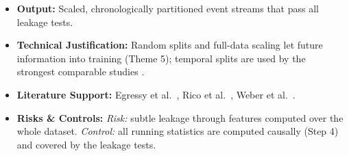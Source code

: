 \documentclass[11pt,a4paper]{article}
\begin{document}
\begin{itemize}[leftmargin=*]
\begin{enumerate}[leftmargin=*]
    \end{enumerate}
    \item \textbf{Output:} Scaled, chronologically partitioned event streams that pass all leakage tests.
    \item \textbf{Technical Justification:} Random splits and full-data scaling let future information into training (Theme 5); temporal splits are used by the strongest comparable studies \cite{egressy2024multigraph,rico2026taml}.
    \item \textbf{Literature Support:} Egressy et al.\ \cite{egressy2024multigraph}, Rico et al.\ \cite{rico2026taml}, Weber et al.\ \cite{weber2019elliptic}.
    \item \textbf{Risks \& Controls:} \textit{Risk:} subtle leakage through features computed over the whole dataset. \textit{Control:} all running statistics are computed causally (Step 4) and covered by the leakage tests.
\end{itemize}

\end{document}
